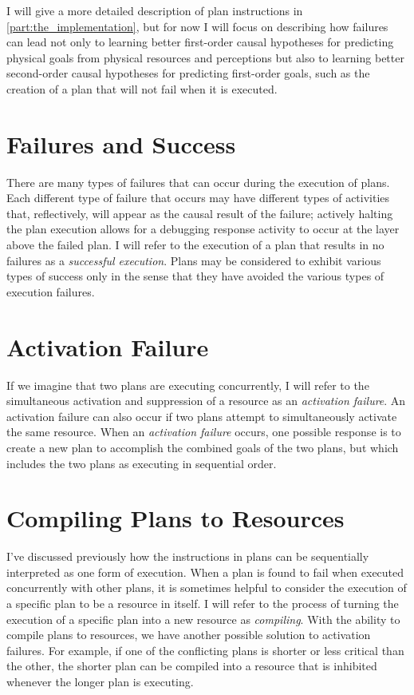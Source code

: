 I will give a more detailed description of plan instructions in
\autoref{part:the_implementation}, but for now I will focus on
describing how failures can lead not only to learning better
first-order causal hypotheses for predicting physical goals from
physical resources and perceptions but also to learning better
second-order causal hypotheses for predicting first-order goals, such
as the creation of a plan that will not fail when it is executed.

\section{Failures and Success}

There are many types of failures that can occur during the execution
of plans.  Each different type of failure that occurs may have
different types of activities that, reflectively, will appear as the
causal result of the failure; actively halting the plan execution
allows for a debugging response activity to occur at the layer above
the failed plan.  I will refer to the execution of a plan that results
in no failures as a \emph{successful execution}.  Plans may be
considered to exhibit various types of success only in the sense that
they have avoided the various types of execution failures.

\section{Activation Failure}

If we imagine that two plans are executing concurrently, I will refer
to the simultaneous activation and suppression of a resource as an
\emph{activation failure}.  An activation failure can also occur if
two plans attempt to simultaneously activate the same resource.  When
an \emph{activation failure} occurs, one possible response is to
create a new plan to accomplish the combined goals of the two plans,
but which includes the two plans as executing in sequential order.

\section{Compiling Plans to Resources}

I've discussed previously how the instructions in plans can be
sequentially interpreted as one form of execution.  When a plan is
found to fail when executed concurrently with other plans, it is
sometimes helpful to consider the execution of a specific plan to be a
resource in itself.  I will refer to the process of turning the
execution of a specific plan into a new resource as \emph{compiling}.
With the ability to compile plans to resources, we have another
possible solution to activation failures.  For example, if one of the
conflicting plans is shorter or less critical than the other, the
shorter plan can be compiled into a resource that is inhibited
whenever the longer plan is executing.


